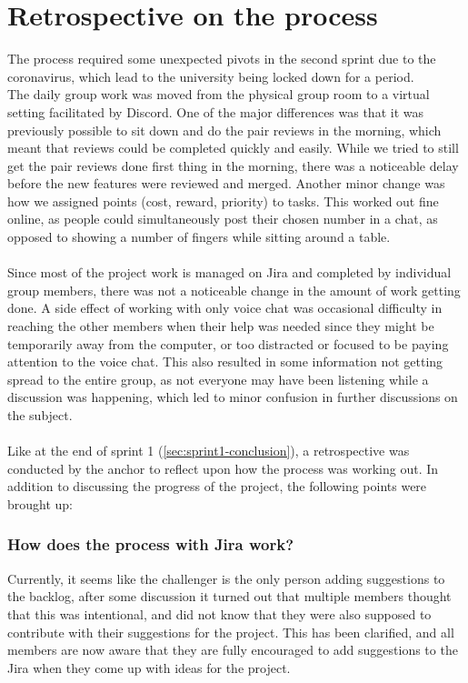 \section{Retrospective on the process}
The process required some unexpected pivots in the second sprint due to the coronavirus, which lead to the university being locked down for a period.
\\
The daily group work was moved from the physical group room to a virtual setting facilitated by Discord.
One of the major differences was that it was previously possible to sit down and do the pair reviews in the morning, which meant that reviews could be completed quickly and easily.
While we tried to still get the pair reviews done first thing in the morning, there was a noticeable delay before the new features were reviewed and merged.
Another minor change was how we assigned points (cost, reward, priority) to tasks. This worked out fine online, as people could simultaneously post their chosen number in a chat, as opposed to showing a number of fingers while sitting around a table.
\\\\
Since most of the project work is managed on Jira and completed by individual group members, there was not a noticeable change in the amount of work getting done.
A side effect of working with only voice chat was occasional difficulty in reaching the other members when their help was needed since they might be temporarily away from the computer, or too distracted or focused to be paying attention to the voice chat.
This also resulted in some information not getting spread to the entire group, as not everyone may have been listening while a discussion was happening, which led to minor confusion in further discussions on the subject.\\\\
Like at the end of sprint 1 (\autoref{sec:sprint1-conclusion}), a retrospective was conducted by the anchor to reflect upon how the process was working out.
In addition to discussing the progress of the project, the following points were brought up:

\subsubsection{How does the process with Jira work?}
Currently, it seems like the challenger is the only person adding suggestions to the backlog, after some discussion it turned out that multiple members thought that this was intentional, and did not know that they were also supposed to contribute with their suggestions for the project.
This has been clarified, and all members are now aware that they are fully encouraged to add suggestions to the Jira when they come up with ideas for the project.

